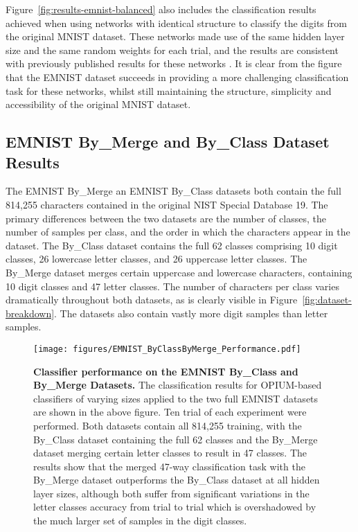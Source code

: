 \documentclass[conference]{IEEEtran}
\begin{document}
Figure~\ref{fig:results-emnist-balanced} also includes the classification results achieved when using networks with identical structure to classify the digits from the original MNIST dataset. These networks made use of the same hidden layer size and the same random weights for each trial, and the results are consistent with previously published results for these networks \cite{VanSchaik2015b}. It is clear from the figure that the EMNIST dataset succeeds in providing a more challenging classification task for these networks, whilst still maintaining the structure, simplicity and accessibility of the original MNIST dataset.

\subsection{EMNIST By\_Merge and By\_Class Dataset Results}
\label{sec:results-bymerge-byclass}

The EMNIST By\_Merge an EMNIST By\_Class datasets both contain the full 814,255 characters contained in the original NIST Special Database 19. The primary differences between the two datasets are the number of classes, the number of samples per class, and the order in which the characters appear in the dataset. The By\_Class dataset contains the full 62 classes comprising 10 digit classes, 26 lowercase letter classes, and 26 uppercase letter classes. The By\_Merge dataset merges certain uppercase and lowercase characters, containing 10 digit classes and 47 letter classes. The number of characters per class varies dramatically throughout both datasets, as is clearly visible in Figure~\ref{fig:dataset-breakdown}. The datasets also contain vastly more digit samples than letter samples. 

\begin{figure}
  \centering
  \texttt{[image: figures/EMNIST\_ByClassByMerge\_Performance.pdf]}
  \caption{\textbf{Classifier performance on the EMNIST By\_Class and By\_Merge Datasets.} The classification results for OPIUM-based classifiers of varying sizes applied to the two full EMNIST datasets are shown in the above figure. Ten trial of each experiment were performed. Both datasets contain all 814,255 training, with the By\_Class dataset containing the full 62 classes and the By\_Merge dataset merging certain letter classes to result in 47 classes. The results show that the merged 47-way classification task with the By\_Merge dataset outperforms the By\_Class dataset at all hidden layer sizes, although both suffer from significant variations in the letter classes accuracy from trial to trial which is overshadowed by the much larger set of samples in the digit classes.}
  \label{fig:results-emnist-bymergebyclass}
\end{figure}
\end{document}
